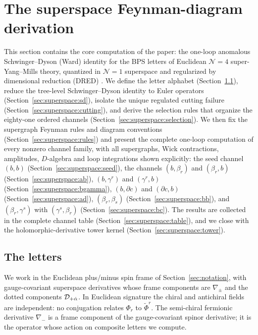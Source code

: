 
\section{The superspace Feynman-diagram derivation}\label{sec:superspace}

This section contains the core computation of the paper: the one-loop anomalous
Schwinger--Dyson (Ward) identity for the BPS letters of Euclidean $\mathcal N=4$
super-Yang--Mills theory, quantized in $\mathcal N=1$ superspace
\cite{GGRS,WeinbergIII} and regularized by dimensional reduction (DRED)
\cite{SiegelDRED}. We define the letter alphabet
(Section~\ref{sec:superspace:letters}), reduce the tree-level Schwinger--Dyson
identity to Euler operators (Section~\ref{sec:superspace:sd}), isolate the unique
regulated cutting failure (Section~\ref{sec:superspace:cutting}), and derive the
selection rules that organize the eighty-one ordered channels
(Section~\ref{sec:superspace:selection}). We then fix the supergraph Feynman
rules and diagram conventions (Section~\ref{sec:superspace:rules}) and present
the complete one-loop computation of every nonzero channel family, with all
supergraphs, Wick contractions, amplitudes, $D$-algebra and loop integrations
shown explicitly: the seed channel $(b,b)$
(Section~\ref{sec:superspace:seed}), the channels $(b,\beta_r)$ and
$(\beta_r,b)$ (Section~\ref{sec:superspace:ab}), $(b,\gamma^r)$ and
$(\gamma^r,b)$ (Section~\ref{sec:superspace:bgamma}), $(b,\partial c)$ and
$(\partial c,b)$ (Section~\ref{sec:superspace:ad}), $(\beta_r,\beta_s)$
(Section~\ref{sec:superspace:bb}), and $(\beta_r,\gamma^s)$ with
$(\gamma^s,\beta_r)$ (Section~\ref{sec:superspace:bc}). The results are
collected in the complete channel table (Section~\ref{sec:superspace:table}),
and we close with the holomorphic-derivative tower kernel
(Section~\ref{sec:superspace:tower}).

\subsection{The letters}\label{sec:superspace:letters}

We work in the Euclidean plus/minus spin frame of Section~\ref{sec:notation},
with gauge-covariant superspace derivatives whose frame components are
$\nabla_\pm$ and the dotted components $\mathcal{D}_{+\dot\alpha}$. In Euclidean
signature the chiral and antichiral fields are independent: no conjugation
relates $\Phi_r$ to $\widetilde\Phi^r$. The semi-chiral fermionic derivative
$\nabla_-$ is a frame component of the gauge-covariant spinor derivative; it is
the operator whose action on composite letters we compute.

